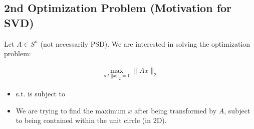 \subsection{2nd Optimization Problem (Motivation for SVD)}
\begin{definition}
    Let \( A \in S^n \) (not necessarily PSD). We are interested in solving the optimization problem:

    \begin{align*}
    \max_{s.t. ||x||_2 = 1} \|A x\|_2  
    \end{align*}
    \begin{itemize}
        \item s.t. is subject to
    \end{itemize}
\end{definition}

\begin{intuition}
    \begin{itemize}
        \item We are trying to find the maximum $x$ after being transformed by $A$, subject to being contained within the unit circle (in 2D).
    \end{itemize}
\end{intuition}

